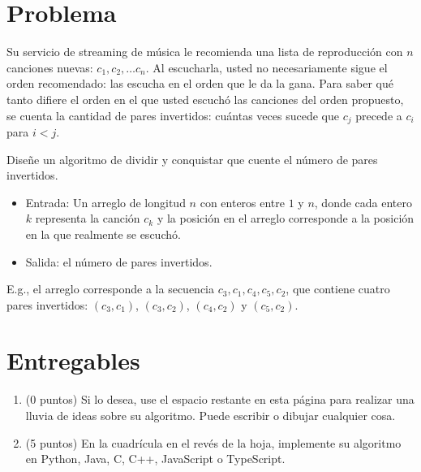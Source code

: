 \section{Problema}
Su servicio de streaming de música le recomienda una lista de reproducción con $n$ canciones nuevas: $c_1, c_2, \ldots c_n$. Al escucharla, usted no necesariamente sigue el orden recomendado: las escucha en el orden que le da la gana. Para saber qué tanto difiere el orden en el que usted escuchó las canciones del orden propuesto, se cuenta la cantidad de pares invertidos: cuántas veces sucede que $c_j$ precede a $c_i$ para $i < j$.

Diseñe un algoritmo de dividir y conquistar que cuente el número de pares invertidos.
\begin{itemize}
  \item Entrada: Un arreglo  de longitud \(n\) con enteros entre $1$ y $n$, donde cada entero $k$ representa la canción $c_k$ y la posición en el arreglo corresponde a la posición en la que realmente se escuchó.
  \item Salida: el número de pares invertidos.
\end{itemize}

E.g., el arreglo \inline{[3, 1, 4, 5, 2]} corresponde a la secuencia \(c_3, c_1, c_4, c_5, c_2\), que contiene cuatro pares invertidos: \((c_3, c_1)\), \((c_3, c_2)\), \((c_4, c_2)\) y \((c_5, c_2)\).

\section{Entregables}

\begin{enumerate}
  \item (0 puntos) Si lo desea, use el espacio restante en esta página para realizar una lluvia de ideas sobre su algoritmo. Puede escribir o dibujar cualquier cosa.
  \item (5 puntos) En la cuadrícula en el revés de la hoja, implemente su algoritmo en Python, Java, C, C++, JavaScript o TypeScript.
\end{enumerate}
